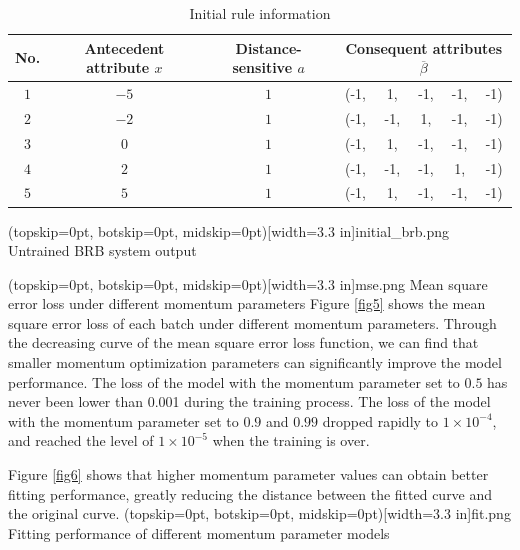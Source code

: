 \documentclass{ieeeaccess}
\begin{document}
\begin{table}
    \caption{Initial rule information}
    \centering
    \normalsize
    \label{tab1}
    \begin{tabular}{cccccccc}
        \hline
        No. & Antecedent attribute $x$ & Distance-sensitive $a$ & \multicolumn{5}{c}{Consequent attributes $\overline{\beta}$}                         \\
        \hline
        $1$ & $-5$                     & $1$                    & (-1,                                                         & 1,  & -1, & -1, & -1) \\
        $2$ & $-2$                     & $1$                    & (-1,                                                         & -1, & 1,  & -1, & -1) \\
        $3$ & $0$                      & $1$                    & (-1,                                                         & 1,  & -1, & -1, & -1) \\
        $4$ & $2$                      & $1$                    & (-1,                                                         & -1, & -1, & 1,  & -1) \\
        $5$ & $5$                      & $1$                    & (-1,                                                         & 1,  & -1, & -1, & -1) \\
        \hline
    \end{tabular}
\end{table}

\Figure[!t](topskip=0pt, botskip=0pt, midskip=0pt)[width=3.3 in]{initial_brb.png}
{Untrained BRB system output\label{fig4}}

\Figure[!t](topskip=0pt, botskip=0pt, midskip=0pt)[width=3.3 in]{mse.png}
{Mean square error loss under different momentum parameters\label{fig5}}
Figure \ref{fig5} shows the mean square error loss of each batch under different momentum parameters.
Through the decreasing curve of the mean square error loss function,
we can find that smaller momentum optimization parameters can significantly improve the model performance.
The loss of the model with the momentum parameter set to $0.5$ has never been lower than 0.001 during the training process.
The loss of the model with the momentum parameter set to $0.9$ and $0.99$ dropped rapidly to $1\times10^{-4}$,
and reached the level of $1\times10^{-5}$ when the training is over.

Figure \ref{fig6} shows that higher momentum parameter values can obtain better fitting performance,
greatly reducing the distance between the fitted curve and the original curve.
\Figure[!t](topskip=0pt, botskip=0pt, midskip=0pt)[width=3.3 in]{fit.png}
{Fitting performance of different momentum parameter models\label{fig6}}
\end{document}
